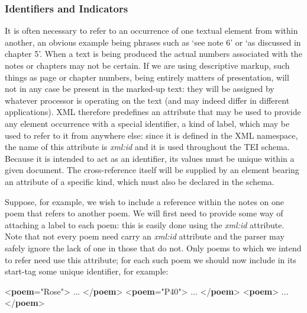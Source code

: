 \subsubsection[{Identifiers and Indicators}]{Identifiers and Indicators}\label{SG-id}\par
It is often necessary to refer to an occurrence of one textual element from within another, an obvious example being phrases such as ‘see note 6’ or ‘as discussed in chapter 5’. When a text is being produced the actual numbers associated with the notes or chapters may not be certain. If we are using descriptive markup, such things as page or chapter numbers, being entirely matters of presentation, will not in any case be present in the marked-up text: they will be assigned by whatever processor is operating on the text (and may indeed differ in different applications). XML therefore predefines an attribute that may be used to provide any element occurrence with a special identifier, a kind of label, which may be used to refer to it from anywhere else: since it is defined in the XML namespace, the name of this attribute is {\itshape xml:id} and it is used throughout the TEI schema. Because it is intended to act as an identifier, its values must be unique within a given document. The cross-reference itself will be supplied by an element bearing an attribute of a specific kind, which must also be declared in the schema.\par
Suppose, for example, we wish to include a reference within the notes on one poem that refers to another poem. We will first need to provide some way of attaching a label to each poem: this is easily done using the {\itshape xml:id} attribute. Note that not every poem need carry an {\itshape xml:id} attribute and the parser may safely ignore the lack of one in those that do not. Only poems to which we intend to refer need use this attribute; for each such poem we should now include in its start-tag some unique identifier, for example: \par\bgroup\exampleFont \begin{shaded}\noindent\mbox{}{<\textbf{poem}\hspace*{1em}{xml:id}="{Rose}">} ... {</\textbf{poem}>}\mbox{}\newline 
{<\textbf{poem}\hspace*{1em}{xml:id}="{P40}">} ... {</\textbf{poem}>}\mbox{}\newline 
{<\textbf{poem}>} ... {</\textbf{poem}>}\end{shaded}\egroup\par \par
